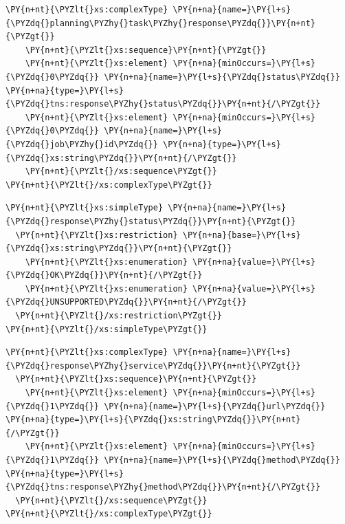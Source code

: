 \begin{program}
\begin{code}
\begin{Verbatim}[commandchars=\\\{\}]
\PY{n+nt}{\PYZlt{}xs:complexType} \PY{n+na}{name=}\PY{l+s}{\PYZdq{}planning\PYZhy{}task\PYZhy{}response\PYZdq{}}\PY{n+nt}{\PYZgt{}}
    \PY{n+nt}{\PYZlt{}xs:sequence}\PY{n+nt}{\PYZgt{}}
	\PY{n+nt}{\PYZlt{}xs:element} \PY{n+na}{minOccurs=}\PY{l+s}{\PYZdq{}0\PYZdq{}} \PY{n+na}{name=}\PY{l+s}{\PYZdq{}status\PYZdq{}} \PY{n+na}{type=}\PY{l+s}{\PYZdq{}tns:response\PYZhy{}status\PYZdq{}}\PY{n+nt}{/\PYZgt{}}
	\PY{n+nt}{\PYZlt{}xs:element} \PY{n+na}{minOccurs=}\PY{l+s}{\PYZdq{}0\PYZdq{}} \PY{n+na}{name=}\PY{l+s}{\PYZdq{}job\PYZhy{}id\PYZdq{}} \PY{n+na}{type=}\PY{l+s}{\PYZdq{}xs:string\PYZdq{}}\PY{n+nt}{/\PYZgt{}}
    \PY{n+nt}{\PYZlt{}/xs:sequence\PYZgt{}}
\PY{n+nt}{\PYZlt{}/xs:complexType\PYZgt{}}
\end{Verbatim}
\end{code}
\end{program}

\begin{program}
\begin{code}
\begin{Verbatim}[commandchars=\\\{\}]
\PY{n+nt}{\PYZlt{}xs:simpleType} \PY{n+na}{name=}\PY{l+s}{\PYZdq{}response\PYZhy{}status\PYZdq{}}\PY{n+nt}{\PYZgt{}}
  \PY{n+nt}{\PYZlt{}xs:restriction} \PY{n+na}{base=}\PY{l+s}{\PYZdq{}xs:string\PYZdq{}}\PY{n+nt}{\PYZgt{}}
    \PY{n+nt}{\PYZlt{}xs:enumeration} \PY{n+na}{value=}\PY{l+s}{\PYZdq{}OK\PYZdq{}}\PY{n+nt}{/\PYZgt{}}
    \PY{n+nt}{\PYZlt{}xs:enumeration} \PY{n+na}{value=}\PY{l+s}{\PYZdq{}UNSUPPORTED\PYZdq{}}\PY{n+nt}{/\PYZgt{}}
  \PY{n+nt}{\PYZlt{}/xs:restriction\PYZgt{}}
\PY{n+nt}{\PYZlt{}/xs:simpleType\PYZgt{}}
\end{Verbatim}
\end{code}
\end{program}

\begin{program}
\begin{code}
\begin{Verbatim}[commandchars=\\\{\}]
\PY{n+nt}{\PYZlt{}xs:complexType} \PY{n+na}{name=}\PY{l+s}{\PYZdq{}response\PYZhy{}service\PYZdq{}}\PY{n+nt}{\PYZgt{}}
  \PY{n+nt}{\PYZlt{}xs:sequence}\PY{n+nt}{\PYZgt{}}
    \PY{n+nt}{\PYZlt{}xs:element} \PY{n+na}{minOccurs=}\PY{l+s}{\PYZdq{}1\PYZdq{}} \PY{n+na}{name=}\PY{l+s}{\PYZdq{}url\PYZdq{}} \PY{n+na}{type=}\PY{l+s}{\PYZdq{}xs:string\PYZdq{}}\PY{n+nt}{/\PYZgt{}}
    \PY{n+nt}{\PYZlt{}xs:element} \PY{n+na}{minOccurs=}\PY{l+s}{\PYZdq{}1\PYZdq{}} \PY{n+na}{name=}\PY{l+s}{\PYZdq{}method\PYZdq{}} \PY{n+na}{type=}\PY{l+s}{\PYZdq{}tns:response\PYZhy{}method\PYZdq{}}\PY{n+nt}{/\PYZgt{}}
  \PY{n+nt}{\PYZlt{}/xs:sequence\PYZgt{}}
\PY{n+nt}{\PYZlt{}/xs:complexType\PYZgt{}}
\end{Verbatim}
\end{code}
\end{program}

